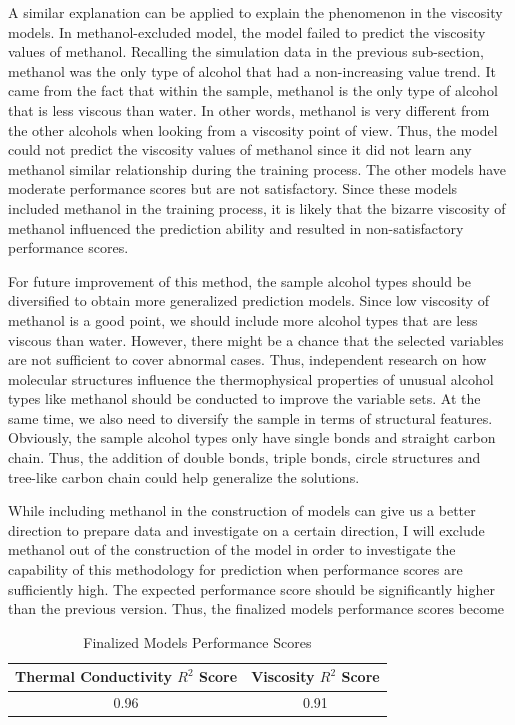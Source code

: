 A similar explanation can be applied to explain the phenomenon in the 
viscosity models. In methanol-excluded model, the model failed to predict 
the viscosity values of methanol. Recalling the simulation data in the 
previous sub-section, methanol was the only type of alcohol that had a 
non-increasing value trend. It came from the fact that within the sample, 
methanol is the only type of alcohol that is less viscous than water. In 
other words, methanol is very different from the other alcohols when looking 
from a viscosity point of view. Thus, the model could not predict the 
viscosity values of methanol since it did not learn any methanol similar 
relationship during the training process. The other models have moderate 
performance scores but are not satisfactory. Since these models included 
methanol in the training process, it is likely that the bizarre viscosity 
of methanol influenced the prediction ability and resulted in non-satisfactory 
performance scores.

For future improvement of this method, the sample alcohol types should be 
diversified to obtain more generalized prediction models. Since low viscosity 
of methanol is a good point, we should include more alcohol types that are 
less viscous than water. However, there might be a chance that the selected 
variables are not sufficient to cover abnormal cases. Thus, independent 
research on how molecular structures influence the thermophysical properties 
of unusual alcohol types like methanol should be conducted to improve the 
variable sets. At the same time, we also need to diversify the sample in terms 
of structural features. Obviously, the sample alcohol types only have single 
bonds and straight carbon chain. Thus, the addition of double bonds, triple 
bonds, circle structures and tree-like carbon chain could help generalize the 
solutions.

While including methanol in the construction of models can give us a better 
direction to prepare data and investigate on a certain direction, I will 
exclude methanol out of the construction of the model in order to investigate 
the capability of this methodology for prediction when performance scores are 
sufficiently high. The expected performance score should be significantly 
higher than the previous version. Thus, the finalized models performance 
scores become
\begin{table}[ht]
    \centering
    \caption{Finalized Models Performance Scores}
    \begin{tabular}{|c|c|}
        \hline
        \hline
        Thermal Conductivity $R^2$ Score & Viscosity $R^2$ Score\\
        \hline
        0.96  & 0.91\\
        \hline
    \end{tabular}
    \label{table:2}
\end{table}

